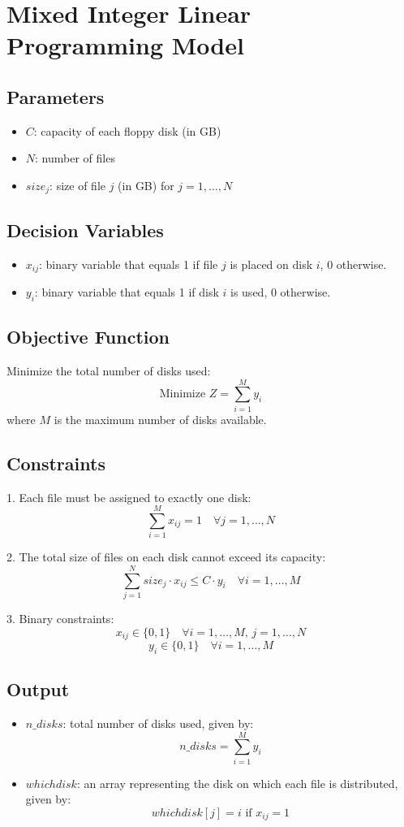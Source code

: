 \documentclass{article}
\begin{document}
\section*{Mixed Integer Linear Programming Model}

\subsection*{Parameters}
\begin{itemize}
    \item $C$: capacity of each floppy disk (in GB)
    \item $N$: number of files
    \item $size_j$: size of file $j$ (in GB) for $j = 1, \ldots, N$
\end{itemize}

\subsection*{Decision Variables}
\begin{itemize}
    \item $x_{ij}$: binary variable that equals 1 if file $j$ is placed on disk $i$, 0 otherwise.
    \item $y_i$: binary variable that equals 1 if disk $i$ is used, 0 otherwise.
\end{itemize}

\subsection*{Objective Function}
Minimize the total number of disks used:
\[
\text{Minimize } Z = \sum_{i=1}^{M} y_i
\]
where $M$ is the maximum number of disks available.

\subsection*{Constraints}
1. Each file must be assigned to exactly one disk:
\[
\sum_{i=1}^{M} x_{ij} = 1 \quad \forall j = 1, \ldots, N
\]

2. The total size of files on each disk cannot exceed its capacity:
\[
\sum_{j=1}^{N} size_j \cdot x_{ij} \leq C \cdot y_i \quad \forall i = 1, \ldots, M
\]

3. Binary constraints:
\[
x_{ij} \in \{0, 1\} \quad \forall i = 1, \ldots, M, \, j = 1, \ldots, N
\]
\[
y_i \in \{0, 1\} \quad \forall i = 1, \ldots, M
\]

\subsection*{Output}
\begin{itemize}
    \item $n\_disks$: total number of disks used, given by:
    \[
    n\_disks = \sum_{i=1}^{M} y_i
    \]
    \item $whichdisk$: an array representing the disk on which each file is distributed, given by:
    \[
    whichdisk[j] = i \text{ if } x_{ij} = 1
    \]
\end{itemize}
\end{document}
